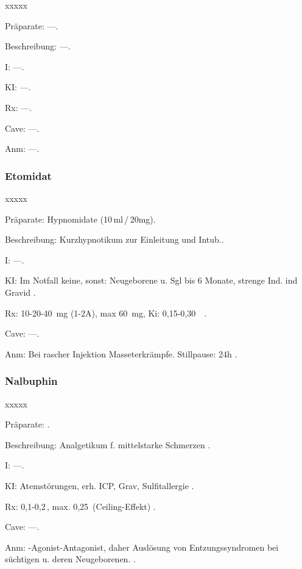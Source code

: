 \begin{labeling}[~]{xxxxx}
  \item[Präparate:]---.
  \item[Beschreibung:] ---.
  \item[I:] ---.
  \item[KI:] ---.
  \item[Rx:] ---.
  \item[Cave:] ---.
  \item[Anm:] ---.
\end{labeling}
\subsubsection{Etomidat}

\begin{labeling}[~]{xxxxx}
  \item[Präparate:]  Hypnomidate (10\,ml\,/\,20mg).
  \item[Beschreibung:]   Kurzhypnotikum zur Einleitung und Intub..
  \item[I:] ---.
  \item[KI:]  Im Notfall keine, sonst: Neugeborene u. Sgl bis 6 Monate, strenge
Ind. ind Gravid .
  \item[Rx:]  10-20-40~mg (1-2A), max 60~mg, Ki: 0,15-0,30~\, .
  \item[Cave:] ---.
  \item[Anm:]  Bei rascher Injektion Masseterkrämpfe. Stillpause: 24h .
\end{labeling}



\subsubsection{Nalbuphin}

\begin{labeling}[~]{xxxxx}
  \item[Präparate:]  .
  \item[Beschreibung:]  Analgetikum f. mittelstarke Schmerzen .
  \item[I:] ---.
  \item[KI:]  Atemstörungen, erh. ICP, Grav, Sulfitallergie .
  \item[Rx:]  0,1-0,2\,, max. 0,25\, (Ceiling-Effekt) .
  \item[Cave:] ---.
  \item[Anm:]  {\textmu}-Agonist-Antagonist, daher Auslösung von Entzungssyndromen
bei süchtigen u. deren Neugeborenen. .
\end{labeling}


